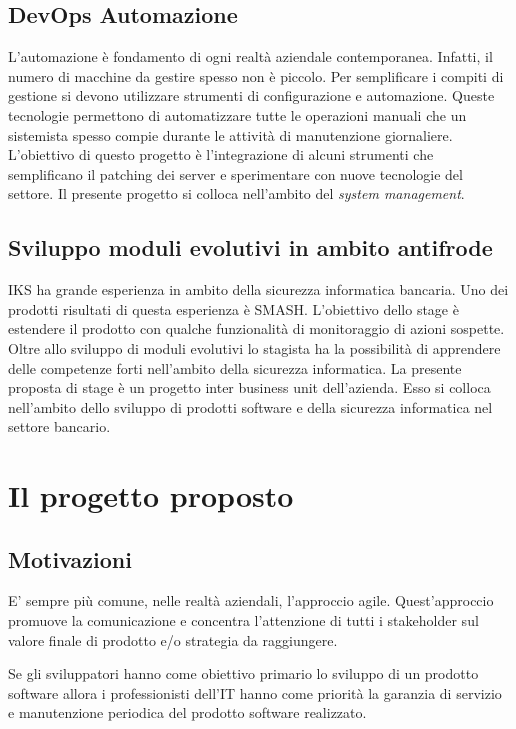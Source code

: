 \subsection{DevOps Automazione}
L'automazione è fondamento di ogni realtà aziendale contemporanea. Infatti, 
il numero di macchine da gestire spesso non è piccolo. Per semplificare i 
compiti di gestione si devono utilizzare strumenti di configurazione e 
automazione. Queste tecnologie permettono di automatizzare tutte le operazioni 
manuali che un sistemista spesso compie durante le attività di manutenzione 
giornaliere. L'obiettivo di questo progetto è l'integrazione di alcuni 
strumenti che semplificano il \gls{patching} dei server e sperimentare con 
nuove tecnologie del settore.
Il presente progetto si colloca nell'ambito del \textit{system management}. 

\subsection{Sviluppo moduli evolutivi in ambito antifrode}
IKS ha grande esperienza in ambito della sicurezza informatica bancaria. Uno 
dei prodotti risultati di questa esperienza è SMASH. L'obiettivo dello stage è 
estendere il prodotto con qualche funzionalità di monitoraggio di azioni 
sospette. Oltre allo sviluppo di moduli evolutivi lo stagista ha la possibilità 
di apprendere delle competenze forti nell'ambito della 
sicurezza informatica. 
La presente proposta di stage è un progetto inter business unit dell'azienda. 
Esso si colloca nell'ambito dello sviluppo di prodotti software e della 
sicurezza informatica nel settore bancario.


\section{Il progetto proposto}
\subsection{Motivazioni}

E' sempre più comune, nelle realtà aziendali, l'approccio agile. 
Quest'approccio 
promuove la comunicazione e concentra l'attenzione di tutti i stakeholder sul 
valore 
finale di prodotto e/o strategia da raggiungere. 

Se gli sviluppatori hanno come obiettivo primario lo sviluppo di un prodotto 
software 
allora i professionisti dell'IT hanno come priorità la garanzia di servizio e 
manutenzione 
periodica del prodotto software realizzato. 


